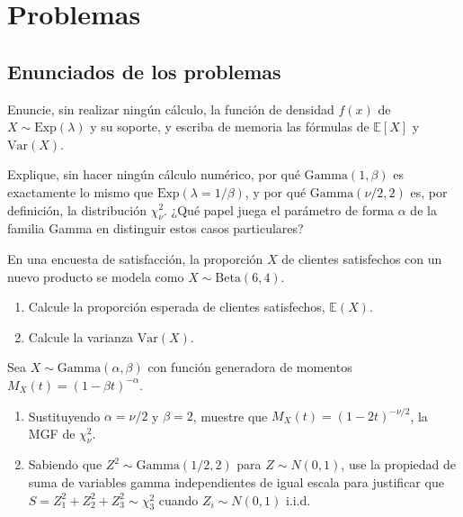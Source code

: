 \section*{Problemas}

\subsection*{Enunciados de los problemas}

\begin{problema}
	\label{prob:f00c4b6}
	Enuncie, sin realizar ningún cálculo, la función de densidad $f(x)$ de $X \sim \text{Exp}(\lambda)$ y su soporte, y escriba de memoria las fórmulas de $\mathbb{E}[X]$ y $\text{Var}(X)$.
\end{problema}

\begin{problema}
	\label{prob:de365e8}
	Explique, sin hacer ningún cálculo numérico, por qué $\text{Gamma}(1,\beta)$ es exactamente lo mismo que $\text{Exp}(\lambda=1/\beta)$, y por qué $\text{Gamma}(\nu/2, 2)$ es, por definición, la distribución $\chi^2_\nu$. ¿Qué papel juega el parámetro de forma $\alpha$ de la familia Gamma en distinguir estos casos particulares?
\end{problema}

\begin{problema}
	\label{prob:491786c}
	En una encuesta de satisfacción, la proporción $X$ de clientes satisfechos con un nuevo producto se modela como $X \sim \text{Beta}(6,4)$.
	\begin{enumerate}
		\item Calcule la proporción esperada de clientes satisfechos, $\mathbb{E}(X)$.
		\item Calcule la varianza $\text{Var}(X)$.
	\end{enumerate}
\end{problema}

\begin{problema}
	\label{prob:6b498ea}
	Sea $X \sim \text{Gamma}(\alpha,\beta)$ con función generadora de momentos $M_X(t) = (1-\beta t)^{-\alpha}$.
	\begin{enumerate}
		\item Sustituyendo $\alpha=\nu/2$ y $\beta=2$, muestre que $M_X(t) = (1-2t)^{-\nu/2}$, la MGF de $\chi^2_\nu$.
		\item Sabiendo que $Z^2 \sim \text{Gamma}(1/2,2)$ para $Z\sim N(0,1)$, use la propiedad de suma de variables gamma independientes de igual escala para justificar que $S=Z_1^2+Z_2^2+Z_3^2 \sim \chi^2_3$ cuando $Z_i \sim N(0,1)$ i.i.d.
	\end{enumerate}
\end{problema}

